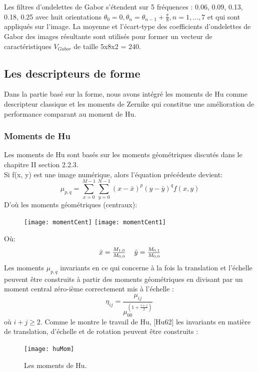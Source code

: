 Les filtres d'ondelettes de Gabor s'étendent sur 5 fréquences : 0.06, 0.09, 0.13, 0.18, 0.25 avec huit orientations $ \theta_0 = 0, \theta_n = \theta_{n-1} + \frac{\pi}{8} , n = 1,...,7$  et qui sont appliqués sur l'image. La moyenne et l'écart-type des coefficients d'ondelettes de Gabor des images résultante sont utilisés pour former un vecteur de caractéristiques $ V_{Gabor} $ de taille 5x8x2 = 240.

\subsection{Les descripteurs de forme}
Dans la partie basé sur la forme, nous avons intégré les moments de Hu comme descripteur classique et les moments de Zernike qui constitue une amélioration de performance comparant au moment de Hu.
\subsubsection{Moments de Hu}
Les moments de Hu sont basés sur les moments géométriques discutés dans le chapitre II section 2.2.3.\\
Si ƒ(x, y) est une image numérique, alors l'équation précédente devient:
\begin{equation}
\mu_{p,q} = \sum_{x=0}^{M-1}\sum_{y=0}^{N-1} (x- \bar{x})^p (y-\bar{y})^q f(x, y)
\end{equation}
D'où les moments géométriques (centraux):
\begin{figure}[H]
	\texttt{[image: momentCent]} \texttt{[image: momentCent1]}
\end{figure}
Où:
\begin{equation}
\begin{tabular}{cc}
$\bar{x} = \frac{M_{1,0}}{M_{0,0}}$ & $\bar{y} = \frac{M_{0,1}}{M_{0,0}}$
\end{tabular}
\end{equation}
Les moments $ \mu_{p,q} $ invariants en ce qui concerne à la fois la translation et l'échelle peuvent être construits à partir des moments géométriques en divisant par un moment central zéro-ième correctement mis à l'échelle :
\begin{equation}
\eta _{{ij}}={\frac  {\mu _{{ij}}}{\mu _{{00}}^{{\left(1+{\frac  {i+j}{2}}\right)}}}}\,\!
\end{equation}
où $ i + j \ge 2 $.
Comme le montre le travail de Hu, [Hu62] les invariants en matière de translation, d'échelle et de rotation peuvent être construits :
\begin{figure}[H]
	\centering
	\texttt{[image: huMom]}
	\caption{Les moments de Hu.}
\end{figure}

